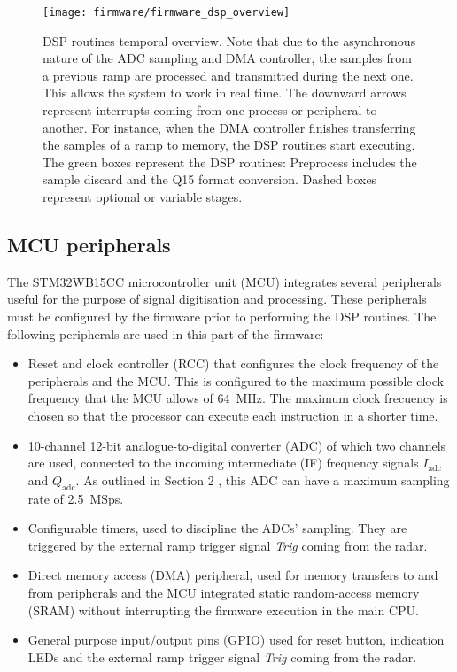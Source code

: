 \begin{figure}[ht]
	\centering
	\texttt{[image: firmware/firmware\_dsp\_overview]}
	\caption{DSP routines temporal overview. Note that due to the asynchronous nature of the ADC sampling and DMA controller, the samples from a previous ramp are processed and transmitted during the next one. This allows the system to work in real time. The downward arrows represent interrupts coming from one process or peripheral to another. For instance, when the DMA controller finishes transferring the samples of a ramp to memory, the DSP routines start executing. The green boxes represent the DSP routines: Preprocess includes the sample discard and the Q15 format conversion. Dashed boxes represent optional or variable stages.}
	\label{fig:firmware_dsp_overview}
\end{figure}

\subsection{MCU peripherals}

The STM32WB15CC microcontroller unit (MCU) integrates several peripherals useful for the purpose of signal digitisation and processing. These peripherals must be configured by the firmware prior to performing the DSP routines. The following peripherals are used in this part of the firmware:
\begin{itemize}
	\item Reset and clock controller (RCC) that configures the clock frequency of the peripherals and the MCU. This is configured to the maximum possible clock frequency that the MCU allows of \SI{64}{\mega\hertz}. The maximum clock frecuency is chosen so that the processor can execute each instruction in a shorter time.
	\item 10-channel 12-bit analogue-to-digital converter (ADC) of which two channels are used, connected to the incoming intermediate (IF) frequency signals $I_{\mathrm{adc}}$ and $Q_{\mathrm{adc}}$. As outlined in Section 2 %
	, this ADC can have a maximum sampling rate of \SI{2.5}{MSps}.
	\item Configurable timers, used to discipline the ADCs' sampling. They are trig\-gered by the external ramp trigger signal \textit{Trig} coming from the radar.
	\item Direct memory access (DMA) peripheral, used for memory transfers to and from peripherals and the MCU integrated static random-access memory (SRAM) without interrupting the firmware execution in the main CPU.
	\item General purpose input/output pins (GPIO) used for reset button, indication LEDs and the external ramp trigger signal \textit{Trig} coming from the radar.
\end{itemize}

